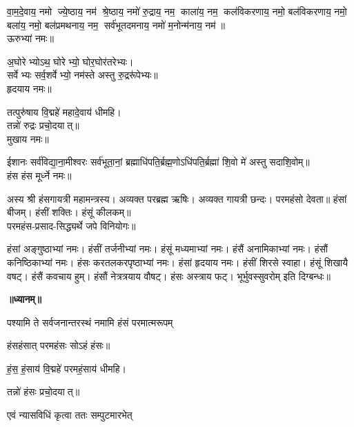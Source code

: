 वा॒म॒दे॒वाय॒ नमो ज्ये॒ष्ठाय॒ नम॑ श्रे॒ष्ठाय॒ नमो॑ रु॒द्राय॒ नम॒ काला॑य॒ नम॒ कल॑विकरणाय॒ नमो॒ बल॑विकरणाय॒ नमो॒ बला॑य॒ नमो॒ बल॑प्रमथनाय॒ नम॒ सर्व॑भूतदमनाय॒ नमो॑ म॒नोन्म॑नाय॒ नम॑॥\\
ऊरुभ्यां नमः॥ 

अ॒घोरेभ्योऽथ॒ घोरेभ्यो॒ घोर॒घोर॑तरेभ्यः।\\
सर्वेभ्यः सर्व॒शर्वेभ्यो॒ नम॑स्ते अस्तु रु॒द्ररू॑पेभ्यः॥\\
हृदयाय नमः॥ 

तत्पुरु॑षाय वि॒द्महे॑ महादे॒वाय॑ धीमहि।\\
तन्नो॑ रुद्रः प्रचो॒दयात्॥\\
मुखाय नमः॥ 

ईशानः सर्व॑विद्या॒ना॒मीश्वरः सर्व॑भूता॒नां॒ ब्रह्माधि॑पति॒र्ब्रह्म॒णो\-ऽधि॑पति॒र्ब्रह्मा॑ शि॒वो मे॑ अस्तु सदाशि॒वोम्॥\\
हंस हंस मूर्ध्ने नमः॥ \\
{\small \closesection}

अस्य श्री हंसगायत्री महामन्त्रस्य। अव्यक्त परब्रह्म ऋषिः। अव्यक्त गायत्री छन्दः। परमहंसो देवता॥ हंसां बीजम्। हंसीं शक्तिः। हंसूं कीलकम्॥\\
परमहंस-प्रसाद-सिद्ध्यर्थे जपे विनियोगः॥

हंसां अङ्गुष्ठाभ्यां नमः।
हंसीं तर्जनीभ्यां नमः।
हंसूं मध्यमाभ्यां नमः।
हंसैं अनामिकाभ्यां नमः।
हंसौं कनिष्ठिकाभ्यां नमः।
हंसः करतलकरपृष्ठाभ्यां नमः।
हंसां हृदयाय नमः।
हंसीं शिरसे स्वाहा।
हंसूं शिखायै वषट्।
हंसैं कवचाय हुम्।
हंसौं नेत्रत्रयाय वौषट्।
हंसः अस्त्राय फट्।
भूर्भुवस्सुवरोम् इति दिग्बन्धः॥

\centerline{\textbf{॥ध्यानम्॥}}
{पश्यामि ते सर्वजनान्तरस्थं नमामि हंसं परमात्मरूपम्}
\smallskip
\centerline{हंसहंसात् परमहंसः सोऽहं हंसः॥}
\smallskip
\centerline{हं॒स॒ हं॒साय॑ वि॒द्महे॑ परमहं॒साय॑ धीमहि।}
\centerline{तन्नो॑ हंसः प्रचो॒दयात्॥ } 
\begin{flushright}
\vspace{-5.7ex}{\small (एवं त्रिः)}
\end{flushright}

{एवं न्यासविधिं कृत्वा ततः सम्पुटमारभेत्}

{\small \closesection}

\newcommand{\indradi}[9]{\refstepcounter{dik}
ॐ भूर्भुव॒ सुव॒रोम्।\\
\lbrack#1\rbrack\  #2। #5।\\#6॥\\%
#2 भूर्भुव॒ सुव॑। #4 #7 साङ्गाय सायुधाय सशक्तिपरिवाराय सर्वालङ्कार\-भूषिताय उमामहेश्वर\-पार्षदाय नमः।\\%
#8दिग्भागे #9 #2 #4 नमः। #3 सुप्रीतो वरदो भवतु॥ \lbrack#3 संरक्षतु॥\rbrack\hfill॥\devanumber{\arabic{dik}}॥}

